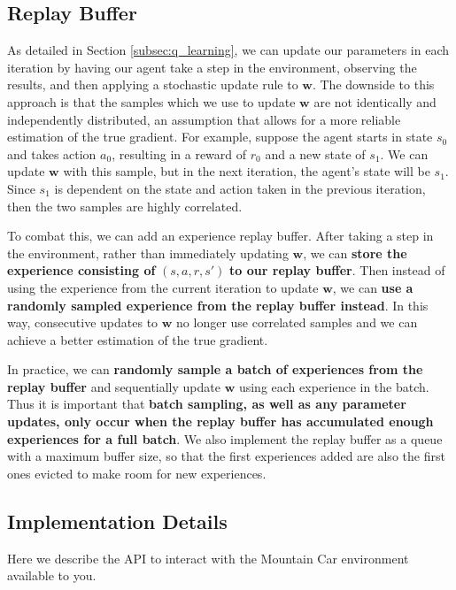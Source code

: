 \documentclass[11pt,addpoints,answers]{exam}
\newcommand{\wv}{\mathbf{w}}
\begin{document}
\subsection{Replay Buffer}
As detailed in Section \ref{subsec:q_learning}, we can update our parameters in each iteration by having our agent take a step in the environment, observing the results, and then applying a stochastic update rule to $\wv$. The downside to this approach is that the samples which we use to update $\wv$ are not identically and independently distributed, an assumption that allows for a more reliable estimation of the true gradient. For example, suppose the agent starts in state $s_0$ and takes action $a_0$, resulting in a reward of $r_0$ and a new state of $s_1$. We can update $\wv$ with this sample, but in the next iteration, the agent's state will be $s_1$. Since $s_1$ is dependent on the state and action taken in the previous iteration, then the two samples are highly correlated.

To combat this, we can add an experience replay buffer. After taking a step in the environment, rather than immediately updating $\wv$, we can \textbf{store the experience consisting of} $(s, a, r, s')$ \textbf{to our replay buffer}. Then instead of using the experience from the current iteration to update $\wv$, we can \textbf{use a randomly sampled experience from the replay buffer instead}. In this way, consecutive updates to $\wv$ no longer use correlated samples and we can achieve a better estimation of the true gradient.

In practice, we can \textbf{randomly sample a batch of experiences from the replay buffer} and sequentially update $\wv$ using each experience in the batch. Thus it is important that \textbf{batch sampling, as well as any parameter updates, only occur when the replay buffer has accumulated enough experiences for a full batch}. We also implement the replay buffer as a queue with a maximum buffer size, so that the first experiences added are also the first ones evicted to make room for new experiences. 

\subsection{Implementation Details}
Here we describe the API to interact with the Mountain Car environment available to you.
\end{document}
